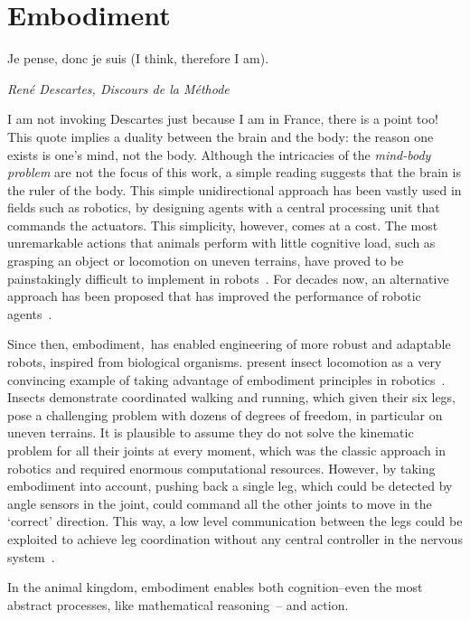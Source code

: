 \section{Embodiment}
\label{ch:intro:Embodiment}
{\singlespacing \epigraph{Je pense, donc je suis (I think, therefore I am).}
{\textit{ Ren\'{e} Descartes, Discours de la M\'{e}thode}}}
\noindent
I am not invoking Descartes just because I am in France, there is a point too!
This quote implies a duality between the brain and the body: the reason one exists is one's mind, not the body.
Although the intricacies of the \textit{mind-body problem} are not the focus of this work, a simple reading suggests that the brain is the ruler of the body.
This simple unidirectional approach has been vastly used in fields such as robotics, by designing agents with a central processing unit that commands the actuators.
This simplicity, however, comes at a cost.
The most unremarkable actions that animals perform with little cognitive load, such as grasping an object or locomotion on uneven terrains, have proved to be painstakingly difficult to implement in robots~\cite{Pfeifer2006Book}.
For decades now, an alternative approach has been proposed that has improved the performance of robotic agents~\cite{Brooks1991AI}.
\par
Since then, embodiment,\footnotemark\ has enabled engineering of more robust and adaptable robots, inspired from biological organisms.
\citeauthor{Pfeifer2007Sci} present insect locomotion as a very convincing example of taking advantage of embodiment principles in robotics~\cite{Pfeifer2007Sci}.
Insects demonstrate coordinated walking and running, which given their six legs, pose a challenging problem with dozens of degrees of freedom, in particular on uneven terrains.
It is plausible to assume they do not solve the kinematic problem for all their joints at every moment, which was the classic approach in robotics and required enormous computational resources.
However, by taking embodiment into account, pushing back a single leg, which could be detected by angle sensors in the joint, could command all the other joints to move in the `correct' direction.
This way, a low level communication between the legs could be exploited to achieve leg coordination without any central controller in the nervous system~\cite{Pfeifer2007Sci}.
\par
In the animal kingdom, embodiment enables both cognition--even the most abstract processes, like mathematical reasoning~\cite{Lakoff2000Book}-- and action.
